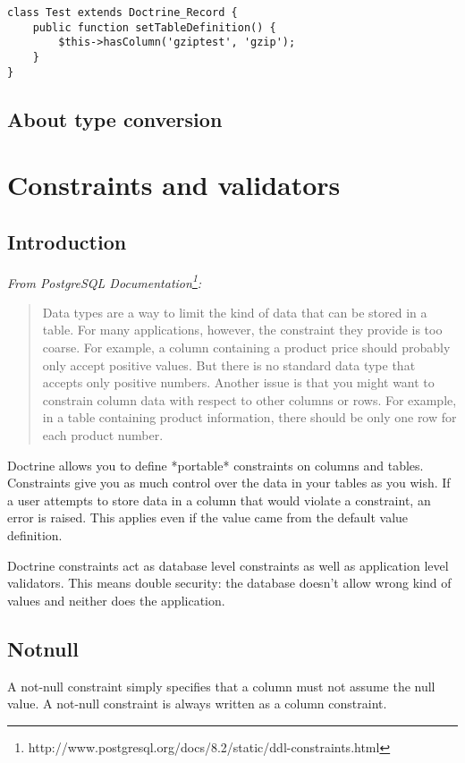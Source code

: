 \documentclass[11pt,a4paper]{report}
\begin{document}
\begin{verbatim}
class Test extends Doctrine_Record {
    public function setTableDefinition() {
        $this->hasColumn('gziptest', 'gzip');
    }
}
\end{verbatim}

\subsection{About type conversion}
\section{Constraints and validators}
\subsection{Introduction}
\textsl{From PostgreSQL Documentation\footnote{http://www.postgresql.org/docs/8.2/static/ddl-constraints.html}:}

\begin{quote}
Data types are a way to limit the kind of data that can be stored in a table. For many applications, however, the constraint they provide is too coarse. For example, a column containing a product price should probably only accept positive values. But there is no standard data type that accepts only positive numbers. Another issue is that you might want to constrain column data with respect to other columns or rows. For example, in a table containing product information, there should be only one row for each product number.\end{quote}

Doctrine allows you to define *portable* constraints on columns and tables. Constraints give you as much control over the data in your tables as you wish. If a user attempts to store data in a column that would violate a constraint, an error is raised. This applies even if the value came from the default value definition.

Doctrine constraints act as database level constraints as well as application level validators. This means double security: the database doesn't allow wrong kind of values and neither does the application.

\subsection{Notnull}
A not-null constraint simply specifies that a column must not assume the null value. A not-null constraint is always written as a column constraint.
\end{document}
